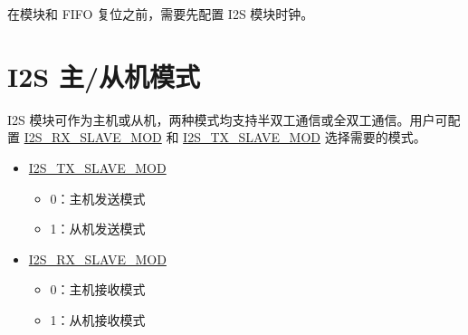 \documentclass[main\_\_CN.tex]{subfiles}
\begin{document}
\begin{tiplisting}
在模块和 FIFO 复位之前，需要先配置 I2S 模块时钟。
\end{tiplisting} 


\section{I2S 主/从机模式}

\chipname{} I2S 模块可作为主机或从机，两种模式均支持半双工通信或全双工通信。用户可配置  \hyperref[fielddesc:I2SRXSLAVEMOD]{I2S\_RX\_SLAVE\_MOD} 和 \hyperref[fielddesc:I2STXSLAVEMOD]{I2S\_TX\_SLAVE\_MOD} 选择需要的模式。

\begin{itemize}
    \item \hyperref[fielddesc:I2STXSLAVEMOD]{I2S\_TX\_SLAVE\_MOD} 
    \begin{itemize}
        \item 0：主机发送模式
        \item 1：从机发送模式
    \end{itemize}
    \item \hyperref[fielddesc:I2SRXSLAVEMOD]{I2S\_RX\_SLAVE\_MOD}
    \begin{itemize}
        \item 0：主机接收模式
        \item 1：从机接收模式
    \end{itemize}
\end{itemize}
\end{document}
